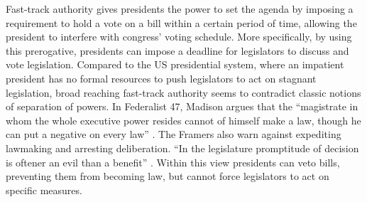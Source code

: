 \documentclass[letter,12pt]{article}
\newcommand{\emm}[1]{\todo[color=red!15, inline]{\textbf{Eric:} #1}}
\newcommand{\ges}[1]{\todo[color=blue!15, inline]{\textbf{Ges:} #1}}
\begin{document}
Fast-track authority gives presidents the power to set the agenda by imposing a requirement to hold a vote on a bill within a certain period of time, allowing the president to interfere with congress' voting schedule. More specifically, by using this prerogative, presidents can impose a deadline for legislators to discuss and vote legislation. Compared to the US presidential system, where an impatient president has no formal resources to push legislators to act on stagnant legislation, broad reaching fast-track authority seems to contradict classic notions of separation of powers. In Federalist 47, Madison argues that the ``magistrate in whom the whole executive power resides cannot of himself make a law, though he can put a negative on every law'' \citep{madison.47}. The Framers also warn against expediting lawmaking and arresting deliberation. ``In the legislature promptitude of decision is oftener an evil than a benefit'' \citep{hamilton70.1788}. Within this view presidents can veto bills, preventing them from becoming law, but cannot force legislators to act on specific measures.



\end{document}
